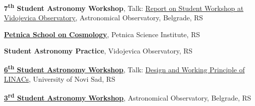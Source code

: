 \begin{scholarship}
                     {{\textbf{7\textsuperscript{th} Student Astronomy Workshop}}, Talk: \href{https://personal.pmf.uns.ac.rs/tijana.prodanovic/teaching/studentska_astro_radionica/vii-sar/}{Report on Student Workshop at Vidojevica Observatory\textsuperscript{\faLink}}, Astronomical Observatory, Belgrade, RS}

                     {\href{http://psi.petnica.rs/2013/description.php}{\textbf{Petnica School on Cosmology}}, Petnica Science Institute, RS}  
                     
                     {{\textbf{Student Astronomy Practice}}, Vidojevica Observatory, RS}

                     {\href{}{\textbf{6\textsuperscript{th} Student Astronomy Workshop}}, Talk: \href{https://personal.pmf.uns.ac.rs/tijana.prodanovic/teaching/studentska_astro_radionica/vi-sar/}{Design and Working Principle of LINACs\textsuperscript{\faLink}}, University of Novi Sad, RS}
                     
                     {\href{}{\textbf{3\textsuperscript{rd} Student Astronomy Workshop}}, Astronomical Observatory, Belgrade, RS}  
                     
   \emptySeparator                    
\end{scholarship}
